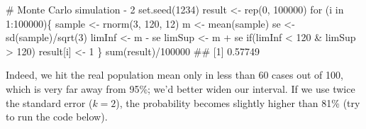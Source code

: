 \documentclass[a4paper,12pt,oneside]{book}
\newenvironment{Shaded}{\begin{snugshade}}{\end{snugshade}}
\newcommand{\DecValTok}[1]{#1}
\newcommand{\SpecialCharTok}[1]{#1}
\newcommand{\CommentTok}[1]{#1}
\newcommand{\DocumentationTok}[1]{#1}
\newcommand{\OtherTok}[1]{#1}
\newcommand{\FunctionTok}[1]{#1}
\newcommand{\ControlFlowTok}[1]{#1}
\newcommand{\NormalTok}[1]{#1}
\begin{document}
\begin{Shaded}
\begin{Highlighting}[]
\CommentTok{\# Monte Carlo simulation {-} 2}
\FunctionTok{set.seed}\NormalTok{(}\DecValTok{1234}\NormalTok{)}
\NormalTok{result }\OtherTok{\textless{}{-}} \FunctionTok{rep}\NormalTok{(}\DecValTok{0}\NormalTok{, }\DecValTok{100000}\NormalTok{)}
\ControlFlowTok{for}\NormalTok{ (i }\ControlFlowTok{in} \DecValTok{1}\SpecialCharTok{:}\DecValTok{100000}\NormalTok{)\{}
\NormalTok{  sample }\OtherTok{\textless{}{-}} \FunctionTok{rnorm}\NormalTok{(}\DecValTok{3}\NormalTok{, }\DecValTok{120}\NormalTok{, }\DecValTok{12}\NormalTok{)}
\NormalTok{  m }\OtherTok{\textless{}{-}} \FunctionTok{mean}\NormalTok{(sample)}
\NormalTok{  se }\OtherTok{\textless{}{-}} \FunctionTok{sd}\NormalTok{(sample)}\SpecialCharTok{/}\FunctionTok{sqrt}\NormalTok{(}\DecValTok{3}\NormalTok{)}
\NormalTok{  limInf }\OtherTok{\textless{}{-}}\NormalTok{ m }\SpecialCharTok{{-}}\NormalTok{ se}
\NormalTok{  limSup }\OtherTok{\textless{}{-}}\NormalTok{ m }\SpecialCharTok{+}\NormalTok{ se}
  \ControlFlowTok{if}\NormalTok{(limInf }\SpecialCharTok{\textless{}} \DecValTok{120} \SpecialCharTok{\&}\NormalTok{ limSup }\SpecialCharTok{\textgreater{}} \DecValTok{120}\NormalTok{) result[i] }\OtherTok{\textless{}{-}} \DecValTok{1}
\NormalTok{\}}
\FunctionTok{sum}\NormalTok{(result)}\SpecialCharTok{/}\DecValTok{100000}
\DocumentationTok{\#\# [1] 0.57749}
\end{Highlighting}
\end{Shaded}

Indeed, we hit the real population mean only in less than 60 cases out of 100, which is very far away from 95\%; we'd better widen our interval. If we use twice the standard error (\(k = 2\)), the probability becomes slightly higher than 81\% (try to run the code below).
\end{document}
